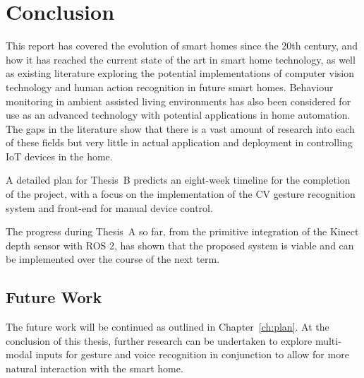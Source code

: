 \chapter{Conclusion}\label{ch:conclusion}

This report has covered the evolution of smart homes since the 20th century, and how it has reached the current state of the art in smart home technology, as well as existing literature exploring the potential implementations of computer vision technology and human action recognition in future smart homes.
Behaviour monitoring in ambient assisted living environments has also been considered for use as an advanced technology with potential applications in home automation.
The gaps in the literature show that there is a vast amount of research into each of these fields but very little in actual application and deployment in controlling IoT devices in the home.

A detailed plan for Thesis~B predicts an eight-week timeline for the completion of the project, with a focus on the implementation of the CV gesture recognition system and front-end for manual device control.

The progress during Thesis~A so far, from the primitive integration of the Kinect depth sensor with ROS 2, has shown that the proposed system is viable and can be implemented over the course of the next term.

\section{Future Work}
The future work will be continued as outlined in Chapter~\ref{ch:plan}.
At the conclusion of this thesis, further research can be undertaken to explore multi-modal inputs for gesture and voice recognition in conjunction to allow for more natural interaction with the smart home.